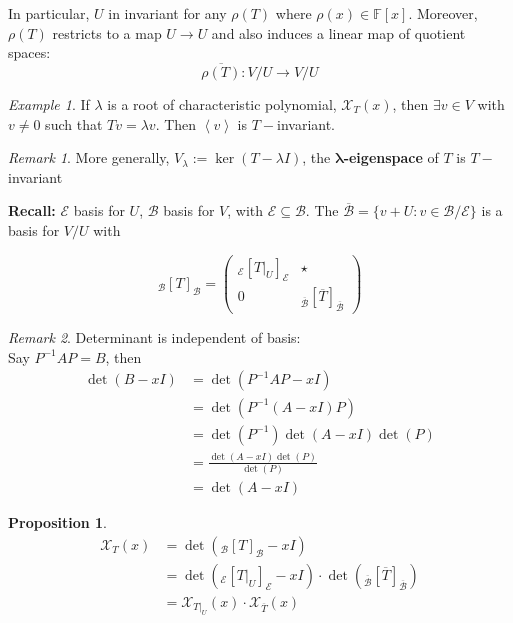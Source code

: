 \documentclass[11pt, a4paper]{report}
\numberwithin{equation}{section}
\renewcommand{\chi}{\mathcal{X}}
\newcommand{\F}{\mathbb{F}}
\newcommand{\spn}[1]{\left\langle #1 \right\rangle}
\newcommand{\pmx}[1]{\begin{pmatrix}#1\end{pmatrix}}
\numberwithin{equation}{subsection}
\theoremstyle{plain}
\theoremstyle{definition}
\newtheorem{prop}[thm]{Proposition}
\theoremstyle{remark}
\newtheorem*{rem}{Remark}
\newtheorem{exmp}{Example}[chapter]
\begin{document}
In particular, $U$ in invariant for any $\rho(T)$ where $\rho(x) \in \F[x]$. Moreover, $\rho(T)$ restricts to a map $U \to U$ and also induces a linear map of quotient spaces: $$\overline{\rho(T)} : V/U \to V/U$$

\begin{exmp} If $\lambda$ is a root of characteristic polynomial, $\chi_T(x)$, then $\exists v \in V$ with $v \neq 0$ such that $Tv = \lambda v$. Then $\spn{v}$ is $T-$invariant. \end{exmp}

\begin{rem} More generally, $V_\lambda := \ker(T - \lambda I)$, the $\boldsymbol{\lambda}$\textbf{-eigenspace} of $T$ is $T-$invariant \end{rem}

\textbf{Recall:} $\mathcal{E}$ basis for $U$, $\mathcal{B}$ basis for $V$, with $\mathcal{E} \subseteq \mathcal{B}$. The $\overline{\mathcal{B}} = \{ v + U : v \in \mathcal{B}/\mathcal{E} \}$ is a basis for $V/U$ with 

$$_\mathcal{B}[T]_\mathcal{B} = \pmx{ _\mathcal{E}[T|_U]_\mathcal{E} & \star \\ 0 & _{\overline{\mathcal{B}}}[\overline{T}]_{\overline{\mathcal{B}}}}$$

\begin{rem} 
Determinant is independent of basis:\\
Say $P^{-1}AP = B$, then
\begin{align*}
\det(B - xI) 	&= \det(P^{-1}AP - xI)\\
				&= \det(P^{-1}(A - xI)P)\\
				&= \det(P^{-1}) \det(A - xI) \det(P)\\
				&= \frac{\det(A - xI) \det(P)}{\det(P)}\\
				&= \det(A - xI)
\end{align*}
\end{rem}

\begin{prop}
\begin{align*}
\chi_T(x)	&= \det \left( _\mathcal{B}[T]_\mathcal{B} - xI \right)\\
			&= \det \left( _\mathcal{E}[T|_U]_\mathcal{E} - xI \right) \cdot \det \left( _{\overline{\mathcal{B}}}[\overline{T}]_{\overline{\mathcal{B}}} \right)\\
			&= \chi_{T|_U}(x) \cdot \chi_{\overline{T}}(x)
\end{align*}
\end{prop}
\end{document}

